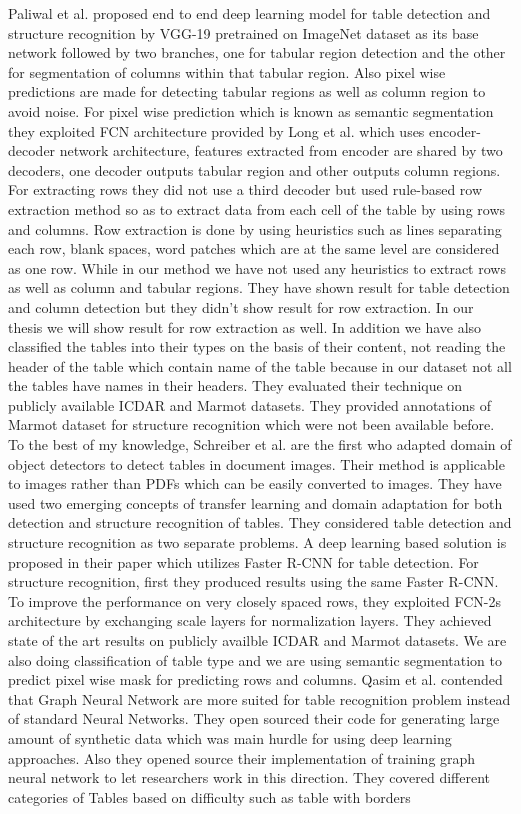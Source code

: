 Paliwal et al. \cite{paliwal2019tablenet} proposed end to end deep learning model for table detection and structure recognition by VGG-19 pretrained on ImageNet dataset as its base network followed by two branches, one for tabular region detection and the other for segmentation of columns within that tabular region. Also pixel wise predictions are made for detecting tabular regions as well as column region to avoid noise. For pixel wise prediction which is known as semantic segmentation they exploited FCN architecture provided by Long et al. \cite{long2015fully} which uses encoder-decoder network architecture, features extracted from encoder are shared by two decoders, one decoder outputs tabular region and other outputs column regions. For extracting rows they did not use a third decoder but used rule-based row extraction method so as to extract data from each cell of the table by using rows and columns. Row extraction is done by using heuristics such as lines separating each row, blank spaces, word patches which are at the same level are considered as one row. While in our method we have not used any heuristics to extract rows as well as column and tabular regions.  They have shown result for table detection and column detection but they didn’t show result for row extraction. In our thesis we will show result for row extraction as well. In addition we have also classified the tables into their types on the basis of their content, not reading the header of the table which contain name of the table because in our dataset not all the tables have names in their headers. They evaluated their technique on publicly available ICDAR and Marmot datasets. They provided annotations of Marmot dataset for structure recognition which were not been available before. To the best of my knowledge, Schreiber et al. \cite{schreiber2017deepdesrt} are the first who adapted domain of object detectors to detect tables in document images. Their method is applicable to images rather than PDFs which can be easily converted to images. They have used two emerging concepts of transfer learning and domain adaptation for both detection and structure recognition of tables. They considered table detection and structure recognition as two separate problems. A deep learning based solution is proposed in their paper which utilizes Faster R-CNN for table detection. For structure recognition, first they produced results using the same Faster R-CNN. To improve the performance on very closely spaced rows, they exploited FCN-2s architecture by exchanging scale layers for normalization layers. They achieved state of the art results on publicly availble ICDAR and Marmot datasets. We are also doing classification of table type and we are using semantic segmentation to predict pixel wise mask for predicting rows and columns. Qasim et al. \cite{qasim2019rethinking} contended that Graph Neural Network are more suited for table recognition problem instead of standard Neural Networks. They open sourced their code for generating large amount of synthetic data which was main hurdle for using deep learning approaches. Also they opened source their implementation of training graph neural network to let researchers work in this direction. They covered different categories of Tables based on difficulty such as table with borders 